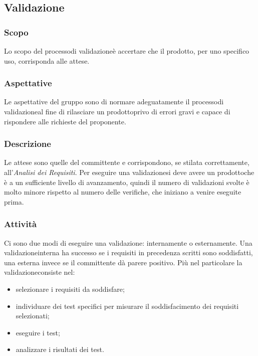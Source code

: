 \subsection{Validazione}

\subsubsection{Scopo}
Lo scopo del processo\glosp di validazione\glosp è accertare che il prodotto\glo, per uno specifico uso, corrisponda alle attese.

\subsubsection{Aspettative}
Le aspettative del gruppo sono di normare adeguatamente il processo\glosp di validazione\glosp al fine di rilasciare un prodotto\glosp privo di errori gravi e capace di rispondere alle richieste del proponente.

\subsubsection{Descrizione}
Le attese sono quelle del committente e corrispondono, se stilata correttamente, all'\textit{Analisi dei Requisiti}. 
Per eseguire una validazione\glosp si deve avere un prodotto\glosp che è a un sufficiente livello di avanzamento, quindi il numero di validazioni svolte è molto minore rispetto al numero delle verifiche, che iniziano a venire eseguite prima.

\subsubsection{Attività}
Ci sono due modi di eseguire una validazione\glo: internamente o esternamente. Una validazione\glosp interna ha successo se i requisiti in precedenza scritti sono soddisfatti, una esterna invece se il committente dà parere positivo. Più nel particolare la validazione\glosp consiste nel:

\begin{itemize}
	\item selezionare i requisiti da soddisfare;
	\item individuare dei test specifici per misurare il soddisfacimento dei requisiti selezionati;
	\item eseguire i test;
	\item analizzare i risultati dei test.
\end{itemize}


